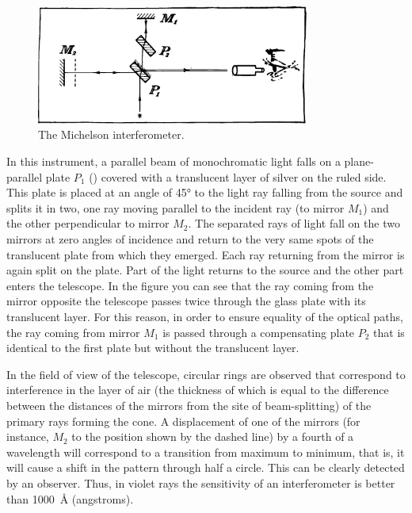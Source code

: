\begin{figure}[!ht]
\centering
\includegraphics[width=0.8\textwidth]{figures/fig-02-07.pdf}
\caption{The Michelson interferometer.}
\label{fig-2.7}
\end{figure}

In this instrument, a parallel beam of monochromatic light falls on a plane-parallel plate $P_{1}$ () cov­ered with a translucent layer of silver on the ruled side. This plate is placed at an angle of \ang{45} to the light ray falling from the source and splits it in two, one ray moving parallel to the incident ray (to mirror $M_{1}$) and the other perpendicular to mirror $M_{2}$. The separated rays of light fall on the two mirrors at zero angles of incidence and return to the very same spots of the translucent plate from which they emerged. Each ray returning from the mirror is again split on the plate. Part of the light returns to the source and the other part enters the telescope. In the figure you can see that the ray coming from the mirror opposite the telescope passes twice through the glass plate with its translucent layer. For this reason, in order to ensure equality of the optical paths, the ray coming from mirror $M_{1}$ is passed through a compensating plate $P_{2}$ that is identical to the first plate but without the translucent layer.

In the field of view of the telescope, circular rings are observed that correspond to interference in the layer of air (the thickness of which is equal to the difference between the distances of the mirrors from the site of beam-splitting) of the primary rays forming the cone. A displacement of one of the mirrors (for instance, $M_{2}$ to the position shown by the dashed line) by a fourth of a wavelength will correspond to a transition from maxi­mum to minimum, that is, it will cause a shift in the pattern through half a circle. This can be clearly detected by an observer. Thus, in violet rays the sensitivity of an interferometer is better than \SI{1000}{\angstrom} (angstroms).

